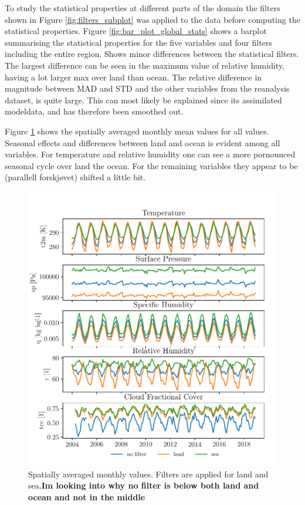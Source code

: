 To study the statistical properties at different parts of the domain the filters shown in Figure \ref{fig:filters_subplot} was applied to the data before computing the statistical properties. Figure \ref{fig:bar_plot_global_stats} shows a barplot summarising the statistical properties for the five variables and four filters including the entire region. Shows minor differences between the statistical filters. The largest difference can be seen in the maximum value of relative humidity, having a lot larger max over land than ocean. The relative difference in magnitude between MAD and STD and the other variables from the reanalysis dataset, is quite large. This can most likely be explained since its assimilated modeldata, and has therefore been smoothed out.

Figure \ref{fig:monthly_mean_ts_vars} shows the spatially averaged monthly mean values for all values. Seasonal effects and differences between land and ocean is evident among all variables. For temperature and relative humidity one can see a more pornounced seasonal cycle over land the ocean. For the remaining variables they appear to be (parallell forskjøvet) shifted a little bit. 
\begin{figure}[ht]
    \centering
    \includegraphics{python_figs/monthly_means.pdf}
    \caption{Spatially averaged monthly values. Filters are applied for land and sea.\textbf{Im looking into why no filter is below both land and ocean and not in the middle}}
    \label{fig:monthly_mean_ts_vars}
\end{figure}

